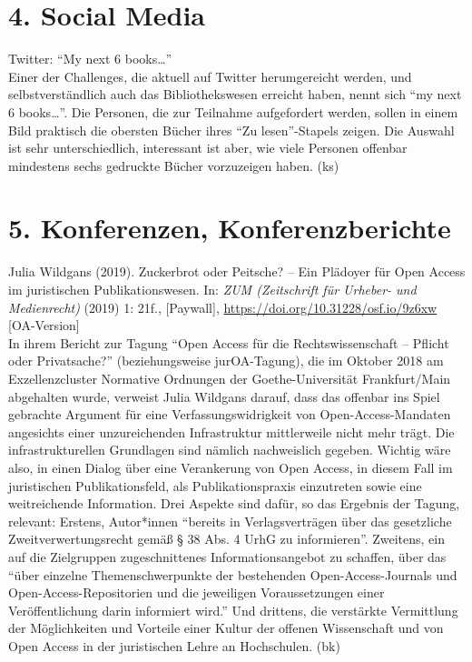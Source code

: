 \documentclass[a4paper,
fontsize=11pt,
oneside,
numbers=noperiodatend,
parskip=half-,
bibliography=totoc,
final
]{scrartcl}
\begin{document}
\hypertarget{social-media}{%
\section{4. Social Media}\label{social-media}}

Twitter: ``My next 6 books\ldots{}''\\
Einer der Challenges, die aktuell auf Twitter herumgereicht werden, und
selbstverständlich auch das Bibliothekswesen erreicht haben, nennt sich
``my next 6 books\ldots{}''. Die Personen, die zur Teilnahme
aufgefordert werden, sollen in einem Bild praktisch die obersten Bücher
ihres ``Zu lesen''-Stapels zeigen. Die Auswahl ist sehr unterschiedlich,
interessant ist aber, wie viele Personen offenbar mindestens sechs
gedruckte Bücher vorzuzeigen haben. (ks)

\hypertarget{konferenzen-konferenzberichte}{%
\section{5. Konferenzen,
Konferenzberichte}\label{konferenzen-konferenzberichte}}

Julia Wildgans (2019). Zuckerbrot oder Peitsche? -- Ein Plädoyer für Open
Access im juristischen Publikationswesen. In: \emph{ZUM (Zeitschrift für
Urheber- und Medienrecht)} (2019) 1: 21f., {[}Paywall{]},
\url{https://doi.org/10.31228/osf.io/9z6xw} {[}OA-Version{]}\\
In ihrem Bericht zur Tagung ``Open Access für die Rechtswissenschaft --
Pflicht oder Privatsache?'' (beziehungsweise jurOA-Tagung), die im
Oktober 2018 am Exzellenzcluster Normative Ordnungen der
Goethe-Universität Frankfurt/Main abgehalten wurde, verweist Julia
Wildgans darauf, dass das offenbar ins Spiel gebrachte Argument für eine
Verfassungswidrigkeit von Open-Access-Mandaten angesichts einer
unzureichenden Infrastruktur mittlerweile nicht mehr trägt. Die
infrastrukturellen Grundlagen sind nämlich nachweislich gegeben. Wichtig
wäre also, in einen Dialog über eine Verankerung von Open Access, in
diesem Fall im juristischen Publikationsfeld, als Publikationspraxis
einzutreten sowie eine weitreichende Information. Drei Aspekte sind
dafür, so das Ergebnis der Tagung, relevant: Erstens, Autor*innen
``bereits in Verlagsverträgen über das gesetzliche Zweitverwertungsrecht
gemäß § 38 Abs. 4 UrhG zu informieren''. Zweitens, ein auf die
Zielgruppen zugeschnittenes Informationsangebot zu schaffen, über das
``über einzelne Themenschwerpunkte der bestehenden Open-Access-Journals
und Open-Access-Repositorien und die jeweiligen Voraussetzungen einer
Veröffentlichung darin informiert wird.'' Und drittens, die verstärkte
Vermittlung der Möglichkeiten und Vorteile einer Kultur der offenen
Wissenschaft und von Open Access in der juristischen Lehre an
Hochschulen. (bk)
\end{document}
